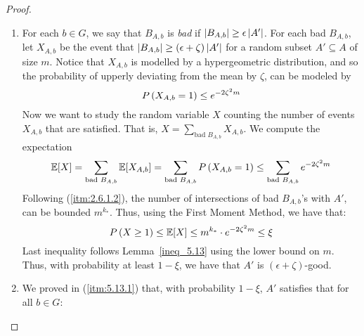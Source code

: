 \begin{proof}
\begin{enumerate}[label=(\alph*), ref=\alph*]
            \item For each $b \in G$, we say that $B_{A,b}$ is \emph{bad} if $\left| B_{A,b} \right| \geq \epsilon \left| A' \right|$.
                For each bad $B_{A,b}$, let $X_{A,b}$ be the event that
                $\left| B_{A,b} \right| \geq \left( \epsilon + \zeta \right) \left| A' \right|$ for a random subset
                $A' \subseteq A$ of size $m$.
                Notice that $X_{A,b}$ is modelled by a hypergeometric distribution, and so the probability of
                upperly deviating from the mean by $\zeta$, can be modeled by
                \[
                    P\left( X_{A,b} = 1 \right) \leq e^{-2\zeta^2 m}
                \]
                Now we want to study the random variable $X$ counting the number of events $X_{A,b}$ that are satisfied.
                That is, $X = \sum_{\text{bad } B_{A,b}} X_{A,b}$.
                We compute the expectation
                \[
                    \mathbb{E}[X] = \sum_{\text{bad } B_{A,b}} \mathbb{E}[X_{A,b}]
                        = \sum_{\text{bad } B_{A,b}} P\left( X_{A,b} = 1 \right)
                        \leq \sum_{\text{bad } B_{A,b}} e^{-2\zeta^2 m}
                \]
                Following (\ref{itm:2.6.1.2}), the number of intersections of bad $B_{A,b}$'s with $A'$, can be bounded $m^{k_*}$.
                Thus, using the First Moment Method, we have that:
                \[
                    P\left( X \geq 1 \right) \leq \mathbb{E}[X] \leq m^{k_*} \cdot e^{-2\zeta^2 m} \leq \xi
                \]
                Last inequality follows Lemma~\ref{ineq_5.13} using the lower bound on $m$.
                Thus, with probability at least $1 - \xi$, we have that $A'$ is $(\epsilon + \zeta)$-good.
            \item We proved in (\ref{itm:5.13.1}) that, with probability $1 - \xi$, $A'$ satisfies that for all
                $b \in G$:
                $$
$$
\end{enumerate}
\end{proof}
